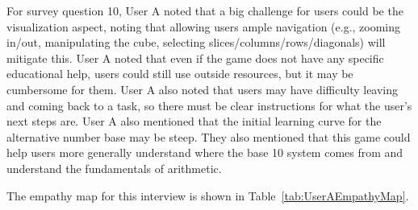 \documentclass{article}
\begin{document}
For survey question 10, User A noted that a big challenge for users could be the visualization aspect, noting that allowing users ample navigation (e.g., zooming in/out, manipulating the cube, selecting slices/columns/rows/diagonals) will mitigate this. User A noted that even if the game does not have any specific educational help, users could still use outside resources, but it may be cumbersome for them. User A also noted that users may have difficulty leaving and coming back to a task, so there must be clear instructions for what the user's next steps are. User A also mentioned that the initial learning curve for the alternative number base may be steep. They also mentioned that this game could help users more generally understand where the base 10 system comes from and understand the fundamentals of arithmetic.

The empathy map for this interview is shown in Table~\ref{tab:UserAEmpathyMap}.
\end{document}
